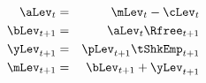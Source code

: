   \begin{eqnarray}
    {\aLev}_{t} & = & \mLev_{t}-\cLev_{t} \label{DBCLevelStart}
    \\  {\bLev}_{t+1} & = & {\aLev}_{t} \Rfree_{t+1}
    \\  {\yLev}_{t+1} & = & \pLev_{t+1}\tShkEmp_{t+1}
    \\  {\mLev}_{t+1} & = & {\bLev}_{t+1} + {\yLev}_{t+1} \label{eq:budconstr} \label{DBCLevelEnd}
  \end{eqnarray}
